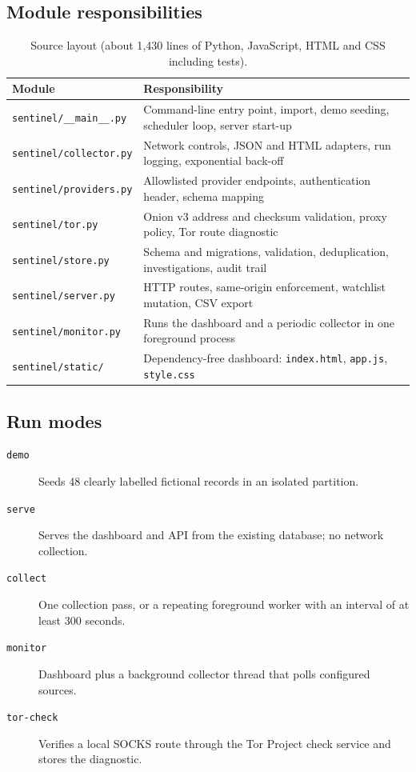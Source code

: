 \documentclass[11pt,a4paper]{article}
\newcommand{\code}[1]{\texttt{\small #1}}
\begin{document}
\subsection{Module responsibilities}
\begin{table}[H]
\centering
\renewcommand{\arraystretch}{1.2}
\begin{tabularx}{\linewidth}{@{}l X@{}}
\toprule
\textbf{Module} & \textbf{Responsibility} \\
\midrule
\code{sentinel/\_\_main\_\_.py} & Command-line entry point, import, demo seeding, scheduler loop, server start-up \\
\code{sentinel/collector.py} & Network controls, JSON and HTML adapters, run logging, exponential back-off \\
\code{sentinel/providers.py} & Allowlisted provider endpoints, authentication header, schema mapping \\
\code{sentinel/tor.py} & Onion v3 address and checksum validation, proxy policy, Tor route diagnostic \\
\code{sentinel/store.py} & Schema and migrations, validation, deduplication, investigations, audit trail \\
\code{sentinel/server.py} & HTTP routes, same-origin enforcement, watchlist mutation, CSV export \\
\code{sentinel/monitor.py} & Runs the dashboard and a periodic collector in one foreground process \\
\code{sentinel/static/} & Dependency-free dashboard: \code{index.html}, \code{app.js}, \code{style.css} \\
\bottomrule
\end{tabularx}
\caption{Source layout (about 1{,}430 lines of Python, JavaScript, HTML and CSS including tests).}
\end{table}

\subsection{Run modes}
\begin{description}
  \item[\code{demo}] Seeds 48 clearly labelled fictional records in an isolated partition.
  \item[\code{serve}] Serves the dashboard and API from the existing database; no network collection.
  \item[\code{collect}] One collection pass, or a repeating foreground worker with an interval of at least 300 seconds.
  \item[\code{monitor}] Dashboard plus a background collector thread that polls configured sources.
  \item[\code{tor-check}] Verifies a local SOCKS route through the Tor Project check service and stores the diagnostic.
\end{description}
\end{document}
